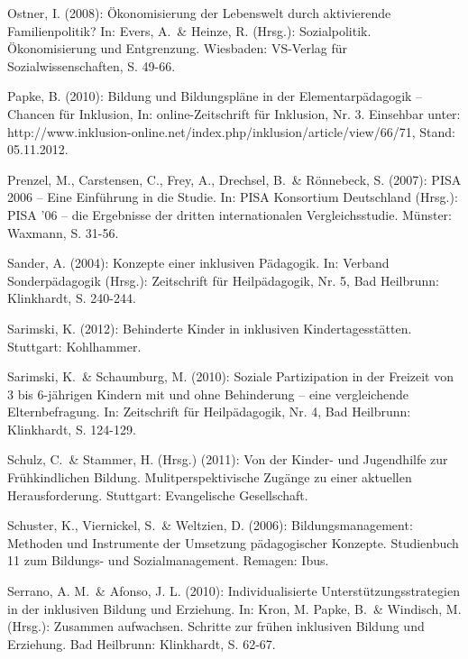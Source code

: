 Ostner, I. (2008): Ökonomisierung der Lebenswelt durch aktivierende Familienpolitik? In: Evers, A.~\& Heinze, R. (Hrsg.): Sozialpolitik. Ökonomisierung und Entgrenzung. Wiesbaden: VS-Verlag für Sozialwissenschaften, S. 49-66.

Papke, B. (2010): Bildung und Bildungspläne in der Elementarpädagogik – Chancen für Inklusion, In: online-Zeitschrift für Inklusion, Nr. 3. Einsehbar unter: http://www.inklusion-online.net/index.php/inklusion/article/view/66/71, Stand: 05.11.2012. 

Prenzel, M., Carstensen, C., Frey, A., Drechsel, B.~\& Rönnebeck, S. (2007): PISA 2006 – Eine Einführung in die Studie. In: PISA Konsortium Deutschland (Hrsg.): PISA '06 – die Ergebnisse der dritten internationalen Vergleichsstudie. Münster: Waxmann, S. 31-56.

Sander, A. (2004): Konzepte einer inklusiven Pädagogik. In: Verband Sonderpädagogik (Hrsg.): Zeitschrift für Heilpädagogik, Nr. 5, Bad Heilbrunn: Klinkhardt, S. 240-244.

Sarimski, K. (2012): Behinderte Kinder in inklusiven Kindertagesstätten. Stuttgart: Kohlhammer. 

Sarimski, K.~\& Schaumburg, M. (2010): Soziale Partizipation in der Freizeit von 3 bis 6-jährigen Kindern mit und ohne Behinderung -- eine vergleichende Elternbefragung. In: Zeitschrift für Heilpädagogik, Nr. 4, Bad Heilbrunn: Klinkhardt, S. 124-129.



Schulz, C.~\& Stammer, H. (Hrsg.) (2011): Von der Kinder- und Jugendhilfe zur Frühkindlichen Bildung. Mulitperspektivische Zugänge zu einer aktuellen Herausforderung. Stuttgart: Evangelische Gesellschaft.

Schuster, K., Viernickel, S.~\& Weltzien, D. (2006): Bildungsmanagement: Methoden und Instrumente der Umsetzung pädagogischer Konzepte. Studienbuch 11 zum Bildungs- und Sozialmanagement. Remagen: Ibus.

Serrano, A. M.~\& Afonso, J. L. (2010): Individualisierte Unterstützungsstrategien in der inklusiven Bildung und Erziehung. In: Kron, M. Papke, B.~\& Windisch, M. (Hrsg.): Zusammen aufwachsen. Schritte zur frühen inklusiven Bildung und Erziehung. Bad Heilbrunn: Klinkhardt, S. 62-67.

